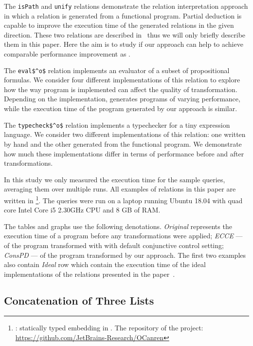 The \lstinline{isPath} and \lstinline{unify} relations demonstrate the relation interpretation approach in which a relation is generated from a functional program.
Partial deduction is capable to improve the execution time of the generated relations in the given direction.
These two relations are described in~\cite{lozov2019relational} thus we will only briefly describe them in this paper.
Here the aim is to study if our approach can help to achieve comparable performance improvement as \ecce.

The \lstinline{eval$^o$} relation implements an evaluator of a subset of propositional formulas.
We consider four different implementations of this relation to explore how the way program is implemented can affect the quality of transformation.
Depending on the implementation, \ecce generates programs of varying performance, while the execution time of the program generated by our approach is similar.

The \lstinline{typecheck$^o$} relation implements a typechecker for a tiny expression language.
We consider two different implementations of this relation: one written by hand and the other generated from the functional program.
We demonstrate how much these implementations differ in terms of performance before and after transformations.

In this study we only measured the execution time for the sample queries, averaging them over multiple runs.
All examples of \mk relations in this paper are written in \oc\footnote{\oc: statically typed \mk embedding in \ocaml. The repository of the project: \url{https://github.com/JetBrains-Research/OCanren}}.
The queries were run on a laptop running Ubuntu 18.04 with quad core Intel Core i5 2.30GHz CPU and 8 GB of RAM.

The tables and graphs use the following denotations.
\emph{Original} represents the execution time of a program before any transformations were applied; \emph{ECCE} --- of the program transformed with \ecce with default conjunctive control setting; \emph{ConsPD} --- of the program transformed by our approach.
The first two examples also contain \emph{Ideal} row which contain the execution time of the ideal implementations of the relations presented in the paper~\cite{de1999conjunctive}.

\subsection{Concatenation of Three Lists}

